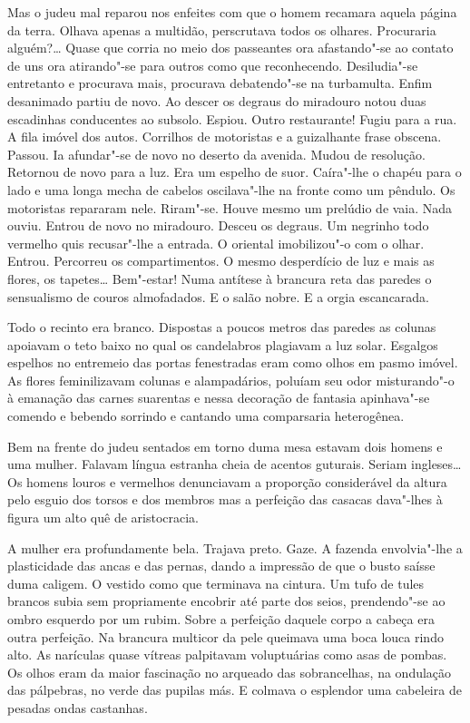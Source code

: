 \begin{linenumbers}
Mas o judeu mal reparou nos enfeites com que o homem recamara aquela
página da terra. Olhava apenas a multidão, perscrutava todos os olhares.
Procuraria alguém?\ldots{} Quase que corria no meio dos passeantes ora
afastando"-se ao contato de uns ora atirando"-se para outros como que
reconhecendo. Desiludia"-se entretanto e procurava mais, procurava
debatendo"-se na turbamulta. Enfim desanimado partiu de novo. Ao descer
os degraus do miradouro notou duas escadinhas conducentes ao subsolo.
Espiou. Outro restaurante! Fugiu para a rua. A fila imóvel dos autos.
Corrilhos de motoristas e a guizalhante frase obscena. Passou. Ia
afundar"-se de novo no deserto da avenida. Mudou de resolução. Retornou
de novo para a luz. Era um espelho de suor. Caíra"-lhe o chapéu para o
lado e uma longa mecha de cabelos oscilava"-lhe na fronte como um
pêndulo. Os motoristas repararam nele. Riram"-se. Houve mesmo um prelúdio
de vaia. Nada ouviu. Entrou de novo no miradouro. Desceu os degraus. Um
negrinho todo vermelho quis recusar"-lhe a entrada. O oriental
imobilizou"-o com o olhar. Entrou. Percorreu os compartimentos. O mesmo
desperdício de luz e mais as flores, os tapetes\ldots{} Bem"-estar! Numa
antítese à brancura reta das paredes o sensualismo de couros
almofadados. E o salão nobre. E a orgia escancarada.

Todo o recinto era branco. Dispostas a poucos metros das paredes as
colunas apoiavam o teto baixo no qual os candelabros plagiavam a luz
solar. Esgalgos espelhos no entremeio das portas fenestradas eram como
olhos em pasmo imóvel. As flores feminilizavam colunas e alampadários,
poluíam seu odor misturando"-o à emanação das carnes suarentas e nessa
decoração de fantasia apinhava"-se comendo e bebendo sorrindo e cantando
uma comparsaria heterogênea.

Bem na frente do judeu sentados em torno duma mesa estavam dois homens e
uma mulher. Falavam língua estranha cheia de acentos guturais. Seriam
ingleses\ldots{} Os homens louros e vermelhos denunciavam a proporção
considerável da altura pelo esguio dos torsos e dos membros mas a
perfeição das casacas dava"-lhes à figura um alto quê de aristocracia.

A mulher era profundamente bela. Trajava preto. Gaze. A fazenda
envolvia"-lhe a plasticidade das ancas e das pernas, dando a impressão de
que o busto saísse duma caligem. O vestido como que terminava na
cintura. Um tufo de tules brancos subia sem propriamente encobrir até
parte dos seios, prendendo"-se ao ombro esquerdo por um rubim. Sobre a
perfeição daquele corpo a cabeça era outra perfeição. Na brancura
multicor da pele queimava uma boca louca rindo alto. As narículas quase
vítreas palpitavam voluptuárias como asas de pombas. Os olhos eram da
maior fascinação no arqueado das sobrancelhas, na ondulação das
pálpebras, no verde das pupilas más. E colmava o esplendor uma cabeleira
de pesadas ondas castanhas.


\end{linenumbers}
